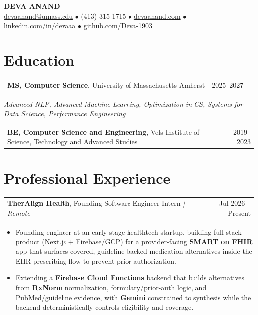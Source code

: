 \documentclass[letterpaper,11pt]{article}
\makeatletter
\newcommand{\eduItem}[3]{%
  \begin{tabular*}{\textwidth}{@{}l@{\extracolsep{\fill}}r@{}}
    \textbf{#1}, #2 & #3 \\
  \end{tabular*}\par
}
\newcommand{\expItem}[4]{%
  \vspace{2pt}
  \begin{tabular*}{\textwidth}{@{}l@{\extracolsep{\fill}}r@{}}
    \textbf{#1}, #2 \textit{| #3} & #4 \\
  \end{tabular*}\par\vspace{-3pt}
}
\makeatother
\begin{document}
\begin{center}
    {\fontsize{18}{20}\selectfont\bfseries DEVA ANAND}\\ \vspace{3pt}
    {\small
    \href{mailto:devaanand@umass.edu}{devaanand@umass.edu}
    \enspace$\bullet$\enspace
    (413) 315-1715
    \enspace$\bullet$\enspace
    \href{https://devaanand.com}{devaanand.com}
    \enspace$\bullet$\enspace
    \href{https://linkedin.com/in/devaaa/}{linkedin.com/in/devaaa}
    \enspace$\bullet$\enspace
    \href{https://github.com/Deva-1903}{github.com/Deva-1903}}
\end{center}
\vspace{-8pt}

\section{Education}
\eduItem{MS, Computer Science}{University of Massachusetts Amherst}{2025--2027}
{\small\textit{Advanced NLP, Advanced Machine Learning, Optimization in CS, Systems for Data Science, Performance Engineering}}\par
\vspace{3pt}
\eduItem{BE, Computer Science and Engineering}{Vels Institute of Science, Technology and Advanced Studies}{2019--2023}

\section{Professional Experience}

\expItem{TherAlign Health}{Founding Software Engineer Intern}{Remote}{Jul 2026 -- Present}
\begin{itemize}
  \item Founding engineer at an early-stage healthtech startup, building full-stack product (Next.js + Firebase/GCP) for a provider-facing \textbf{SMART on FHIR} app that surfaces covered, guideline-backed medication alternatives inside the EHR prescribing flow to prevent prior authorization.
  \item Extending a \textbf{Firebase Cloud Functions} backend that builds alternatives from \textbf{RxNorm} normalization, formulary/prior-auth logic, and PubMed/guideline evidence, with \textbf{Gemini} constrained to synthesis while the backend deterministically controls eligibility and coverage.
\end{itemize}
\end{document}
